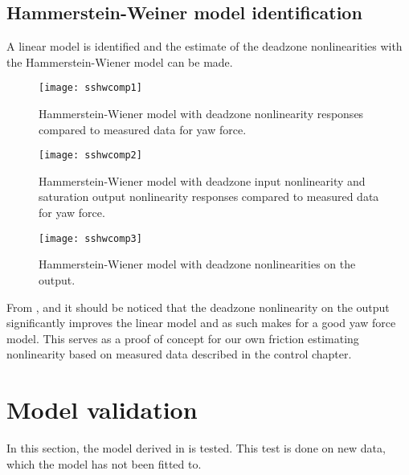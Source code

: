 \subsection{Hammerstein-Weiner model identification}\label{hammerWeinmodeid}

A linear model is identified and the estimate of the deadzone nonlinearities with the Hammerstein-Wiener model can be made.


\begin{figure}[H]
\centering
\hspace{-2.5em}\texttt{[image: sshwcomp1]}
\caption{Hammerstein-Wiener model with deadzone nonlinearity responses compared to measured data for yaw force.}
\label{fig:2LMI}
\end{figure}

\begin{figure}[H]
\centering
\hspace{-2.5em}\texttt{[image: sshwcomp2]}
\caption{Hammerstein-Wiener model with deadzone input nonlinearity and saturation output nonlinearity responses compared to measured data for yaw force.}
\label{fig:2LMI1}
\end{figure}

\begin{figure}[H]
\centering
\hspace{-2.5em}\texttt{[image: sshwcomp3]}
\caption{Hammerstein-Wiener model with deadzone nonlinearities on the output.}
\label{fig:2LMI2}
\end{figure}

From ,  and  it should be noticed that the deadzone nonlinearity on the output significantly improves the linear model and as such makes for a good yaw force model.
This serves as a proof of concept for our own friction estimating nonlinearity based on measured data described in the control chapter.

\section{Model validation} \label{se:mdval}
In this section, the model derived in  is tested. This test is done on new data, which the model has not been fitted to.

